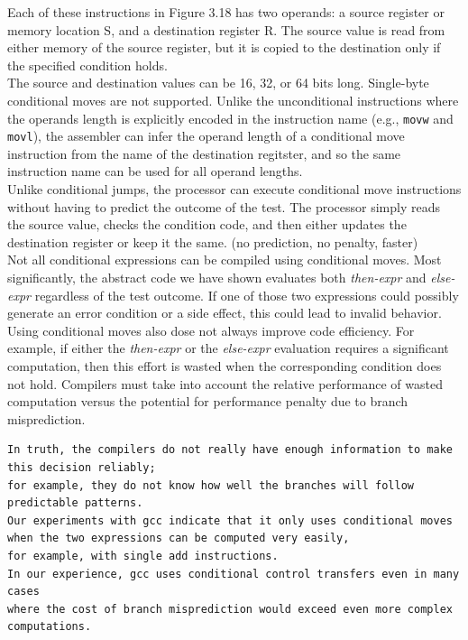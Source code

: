 \documentclass[11pt]{article}
\begin{document}
Each of these instructions in Figure 3.18 has two operands: a source register or memory location S, and a destination register R. The source value is read from either memory of the source register, but it is copied to the destination only if the specified condition holds.\\

The source and destination values can be 16, 32, or 64 bits long. Single-byte conditional moves are not supported. Unlike the unconditional instructions where the operands length is explicitly encoded in the instruction name (e.g., \texttt{movw} and \texttt{movl}), the assembler can infer the operand length of a conditional move instruction from the name of the destination regitster, and so the same instruction name can be used for all operand lengths.\\

Unlike conditional jumps, the processor can execute conditional move instructions without having to predict the outcome of the test. The processor simply reads the source value, checks the condition code, and then either updates the destination register or keep it the same. (no prediction, no penalty, faster)\\



Not all conditional expressions can be compiled using conditional moves. Most significantly, the abstract code we have shown evaluates both \emph{then-expr} and \emph{else-expr} regardless of the test outcome. If one of those two expressions could possibly generate an error condition or a side effect, this could lead to invalid behavior.\\

Using conditional moves also dose not always improve code efficiency. For example, if either the \emph{then-expr} or the \emph{else-expr} evaluation requires a significant computation, then this effort is wasted when the corresponding condition does not hold. Compilers must take into account the relative performance of wasted computation versus the potential for performance penalty due to branch misprediction.\\

\begin{verbatim}
In truth, the compilers do not really have enough information to make this decision reliably; 
for example, they do not know how well the branches will follow predictable patterns. 
Our experiments with gcc indicate that it only uses conditional moves 
when the two expressions can be computed very easily, 
for example, with single add instructions. 
In our experience, gcc uses conditional control transfers even in many cases 
where the cost of branch misprediction would exceed even more complex computations.
\end{verbatim}
\end{document}
